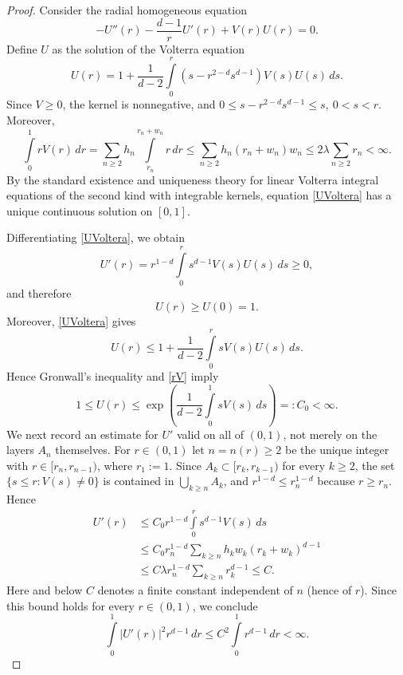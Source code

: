 \documentclass[11pt,reqno]{amsart}
\begin{document}
\begin{proof}
Consider the radial homogeneous equation
$$-U''(r)-\frac{d-1}{r}U'(r)+V(r)U(r)=0.$$
Define $U$ as the solution of the Volterra equation
\begin{equation}\label{UVoltera}
U(r)=1+\frac{1}{d-2}\int\limits_0^r\left(s-r^{2-d}s^{d-1}\right)V(s)U(s)\,ds.
\end{equation}
Since $V\ge 0$, the kernel is nonnegative, and $0\le s-r^{2-d}s^{d-1}\le s,\  0<s<r$. Moreover,
\begin{equation}\label{rV}
\int\limits_0^1 rV(r)\,dr=\sum_{n\ge 2}h_n\int\limits_{r_n}^{r_n+w_n}r\,dr\le\sum_{n\ge 2}h_n(r_n+w_n)w_n\le
2\lambda\sum_{n\ge 2}r_n<\infty.
\end{equation}
By the standard existence and uniqueness theory for linear Volterra integral equations of the second kind with integrable kernels, equation \eqref{UVoltera} has a unique continuous solution on $[0,1]$.
\par
Differentiating \eqref{UVoltera}, we obtain
$$U'(r)=r^{1-d}\int\limits_0^r s^{d-1}V(s)U(s)\,ds\ge 0,$$
and therefore
\begin{equation}\label{Ule1}
U(r)\ge U(0)=1.
\end{equation}
Moreover, \eqref{UVoltera} gives
$$U(r)\le 1+\frac{1}{d-2}\int\limits_0^r sV(s)U(s)\,ds.$$
Hence Gronwall's inequality and \eqref{rV} imply
\begin{equation}\label{Uge1}
1\le U(r)\le\exp\left(\frac{1}{d-2}\int\limits_0^1sV(s)\,ds\right)=:C_0<\infty.
\end{equation}
We next record an estimate for $U'$ valid on all of $(0,1)$, not merely on the layers $A_n$ themselves. For $r\in(0,1)$ let $n=n(r)\ge 2$ be the unique integer with $r\in[r_n,r_{n-1})$, where $r_1:=1$.
Since $A_k\subset[r_k,r_{k-1})$ for every $k\ge 2$, the set $\{s\le r:V(s)\ne 0\}$ is contained in $\bigcup_{k\ge n}A_k$, and $r^{1-d}\le r_n^{1-d}$ because $r\ge r_n$. Hence
\begin{equation}\label{UPrime}
\begin{aligned}
U'(r)
&\le
C_0r^{1-d}\int\limits_0^r s^{d-1}V(s)\,ds\\
&\le
C_0 r_n^{1-d}
\sum_{k\ge n}h_kw_k (r_k+w_k)^{d-1}\\
&\le
C\lambda r_n^{1-d}\sum_{k\ge n}r_k^{d-1}
\le C.
\end{aligned}
\end{equation}
Here and below $C$ denotes a finite constant independent of $n$ (hence of $r$). Since this bound holds for every $r\in(0,1)$, we conclude
$$\int\limits_0^1|U'(r)|^2r^{d-1}\,dr\le C^2\int\limits_0^1r^{d-1}\,dr<\infty.$$

\end{proof}
\end{document}
